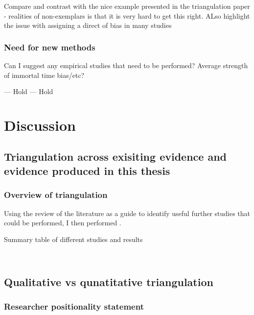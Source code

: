 \documentclass[a4paper, twoside]{templates/ociamthesis}
\begin{document}
Compare and contrast with the nice example presented in the triangulation paper - realities of non-exemplars is that it is very hard to get this right. ALso highlight the issue with assigning a direct of bias in many studies

\hypertarget{need-for-new-methods}{%
\subsection{Need for new methods}\label{need-for-new-methods}}

Can I suggest any empirical studies that need to be performed? Average strength of immortal time bias/etc?

--- Hold --- Hold

\hypertarget{discussion-heading}{%
\chapter{Discussion}\label{discussion-heading}}

\minitoc 

\hypertarget{triangulation-across-exisiting-evidence-and-evidence-produced-in-this-thesis}{%
\section{Triangulation across exisiting evidence and evidence produced in this thesis}\label{triangulation-across-exisiting-evidence-and-evidence-produced-in-this-thesis}}

\hypertarget{triangulation-overview}{%
\subsection{Overview of triangulation}\label{triangulation-overview}}

Using the review of the literature as a guide to identify useful further studies that could be performed, I then performed .

Summary table of different studies and results

~

\hypertarget{qualitative-vs-qunatitative-triangulation}{%
\section{Qualitative vs qunatitative triangulation}\label{qualitative-vs-qunatitative-triangulation}}

\hypertarget{researcher-positionality-statement}{%
\subsection{Researcher positionality statement}\label{researcher-positionality-statement}}
\end{document}
